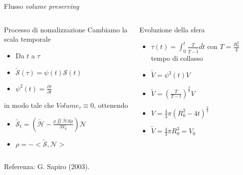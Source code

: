 \begin{frame}{Flusso \emph{volume preserving}}
  \begin{columns}[T]
    \begin{column}{6cm}
      \begin{block}{Processo di nomalizzazione}
        Cambiamo la scala temporale
        \begin{itemize}
        \item Da $t$ a $\tau$
        \item $\mathcal{\tilde{S}(\tau)}=\psi(t)\mathcal{S}(t)$ 
        \item $\psi^2(t)=\frac{\partial\tau}{\partial t}$
        \end{itemize}
         in modo tale che \alert{$Volume_{\tau}\equiv 0$}, ottenendo   
         \begin{itemize}
         \item $\mathcal{\tilde{S}}_t=\left(\mathcal{\tilde{H}}-\frac{\rho\iint\mathcal{\tilde{H}}d\mu}{3V_0}\right)\mathcal{N}$
         \item $\rho =-<\mathcal{\tilde{S}},\mathcal{N}>$
         \end{itemize}
      \end{block}
    \end{column}
    \begin{column}[T]{4cm}
      \begin{exampleblock}{Evoluzione della sfera}
        \begin{itemize}
        \item $\tau(t)=\int_0^t\frac{T}{T-\tilde{t}}d\tilde{t}$ con
          $T=\frac{R_0^2}{4}$ tempo di 
          collasso
        \item $\tilde{V}=\psi^3(t)V$
        \item $\tilde{V}=\left(\frac{T}{T-t}\right)^{\frac{3}{2}}V$
        \item $V=\frac{4}{3}\pi(R_0^2-4t)^{\frac{3}{2}}$
        \item $\tilde{V}=\frac{4}{3}\pi R_0^3=V_0$
        \end{itemize}
      \end{exampleblock}
    \end{column}
  \end{columns}
Referenza: G. Sapiro (2003).
\end{frame}
